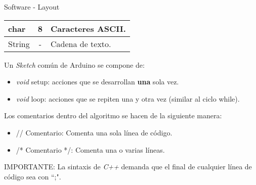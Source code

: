 \begin{frame}[allowframebreaks]{Software - Layout}
\begin{table}[h!]
\begin{adjustbox}{max width=\textwidth}
\begin{tabular}{|l|r|l|}
char                                         & 8                                           & Caracteres ASCII.                                                                             \\ \hline
String                                       & \multicolumn{1}{c|}{-}                      & Cadena de texto.                                                                              \\ \hline
\end{tabular}
\end{adjustbox}
\end{table}

\vspace{20pt}

Un \textit{Sketch} com\'un de Arduino se compone de:

\begin{itemize}
	\item \textit{void} setup: acciones que se desarrollan \textbf{una} sola vez.
	\item \textit{void} loop: acciones que se repiten una y otra vez (similar al ciclo while).
\end{itemize}

\vspace{10pt}

Los comentarios dentro del algoritmo se hacen de la siguiente manera:

\begin{itemize}
	\item // Comentario: Comenta una sola l\'inea de c\'odigo.
	\item /* Comentario */: Comenta una o varias l\'ineas. 
\end{itemize}

\vspace{10pt}

IMPORTANTE: La sintaxis de \textit{C++} demanda que el final de cualquier l\'inea de c\'odigo sea con ``;".

\end{frame}